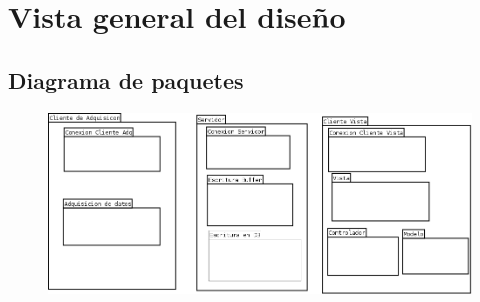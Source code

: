 %
%
%

\newpage
\section{\textcolor[gray]{.2}{Vista general del diseño}}
\subsection{\textcolor[gray]{.2}{Diagrama de paquetes}}
\begin{figure}[h!]
 \begin{center}
  \includegraphics[width=1\textwidth,keepaspectratio=true]{img/diagrama_paquetes.png}
  \label{fig:esquema}
 \end{center}
\end{figure}


